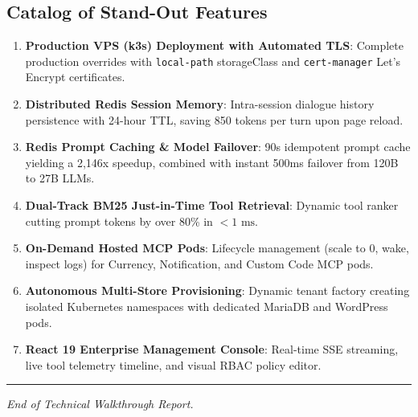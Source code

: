 \documentclass[11pt,a4paper]{article}
\begin{document}
\subsection{Catalog of Stand-Out Features}
\begin{enumerate}[leftmargin=*]
    \item \textbf{Production VPS (k3s) Deployment with Automated TLS}: Complete production overrides with \texttt{local-path} storageClass and \texttt{cert-manager} Let's Encrypt certificates.
    \item \textbf{Distributed Redis Session Memory}: Intra-session dialogue history persistence with 24-hour TTL, saving 850 tokens per turn upon page reload.
    \item \textbf{Redis Prompt Caching \& Model Failover}: 90s idempotent prompt cache yielding a 2,146x speedup, combined with instant 500ms failover from 120B to 27B LLMs.
    \item \textbf{Dual-Track BM25 Just-in-Time Tool Retrieval}: Dynamic tool ranker cutting prompt tokens by over 80\% in $<1\text{ ms}$.
    \item \textbf{On-Demand Hosted MCP Pods}: Lifecycle management (scale to 0, wake, inspect logs) for Currency, Notification, and Custom Code MCP pods.
    \item \textbf{Autonomous Multi-Store Provisioning}: Dynamic tenant factory creating isolated Kubernetes namespaces with dedicated MariaDB and WordPress pods.
    \item \textbf{React 19 Enterprise Management Console}: Real-time SSE streaming, live tool telemetry timeline, and visual RBAC policy editor.
\end{enumerate}

\vspace{1cm}
\begin{center}
\rule{0.6\textwidth}{0.5pt} \par
\vspace{0.3cm}
\textit{End of Technical Walkthrough Report.}
\end{center}
\end{document}

